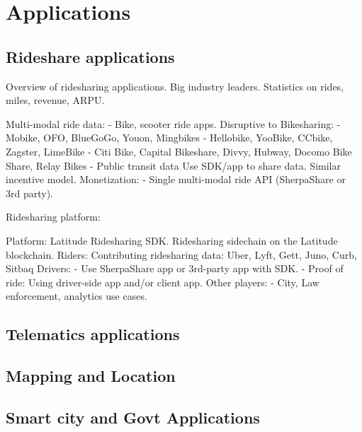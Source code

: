 \section{Applications}
\label{sec:apps}

\subsection{Rideshare applications}

Overview of ridesharing applications. Big industry leaders. Statistics on rides, miles, revenue, ARPU.

Multi-modal ride data:
 - Bike, scooter ride apps.
Disruptive to Bikesharing:
 - Mobike, OFO, BlueGoGo, Youon, Mingbikes
 - Hellobike, YooBike, CCbike, Zagster, LimeBike
 - Citi Bike, Capital Bikeshare, Divvy, Hubway, Docomo Bike
Share, Relay Bikes
 - Public transit data
Use SDK/app to share data. Similar incentive model.
Monetization:
 - Single multi-modal ride API (SherpaShare or 3rd party).

 Ridesharing platform:

 Platform:
Latitude Ridesharing SDK.
Ridesharing sidechain on the Latitude blockchain.
Riders:
Contributing ridesharing data:
Uber, Lyft, Gett, Juno, Curb, Sitbaq
Drivers:
 - Use SherpaShare app or 3rd-party app with SDK.
 - Proof of ride:
Using driver-side app and/or client app.
Other players:
 - City, Law enforcement, analytics use cases.

\subsection{Telematics applications}


\subsection{Mapping and Location}

\subsection{Smart city and Govt Applications}
